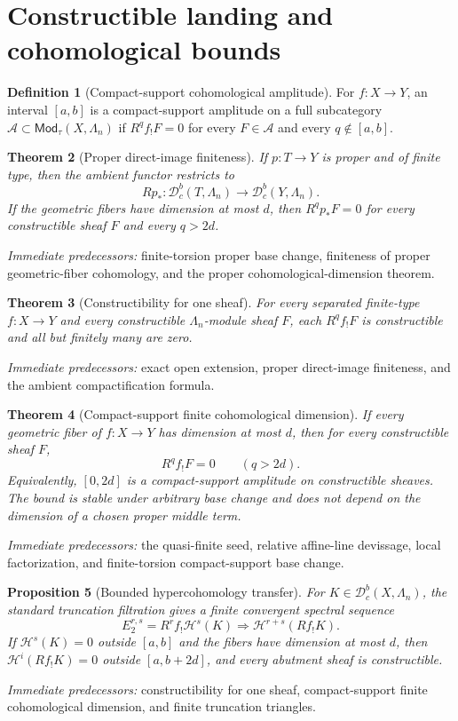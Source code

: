 \documentclass[10pt]{article}
\newtheorem{theorem}{Theorem}[section]
\newtheorem{proposition}[theorem]{Proposition}
\theoremstyle{definition}
\newtheorem{definition}[theorem]{Definition}
\newcommand{\Dbc}{\mathcal D^b_c}
\newcommand{\Mod}{\mathsf{Mod}}
\newcommand{\pred}[1]{\par\smallskip\begingroup\footnotesize\raggedright
\emph{Immediate predecessors:} #1.\par\endgroup}
\begin{document}
\section{Constructible landing and cohomological bounds}

\begin{definition}[Compact-support cohomological amplitude]
For \(f:X\to Y\), an interval \([a,b]\) is a compact-support amplitude on
a full subcategory \(\mathcal A\subset\Mod_\tau(X,\Lambda_n)\) if
\(R^qf_!F=0\) for every \(F\in\mathcal A\) and every
\(q\notin[a,b]\).
\end{definition}

\begin{theorem}[Proper direct-image finiteness]
If \(p:T\to Y\) is proper and of finite type, then the ambient functor
restricts to
\[
 Rp_*:\Dbc(T,\Lambda_n)\longrightarrow\Dbc(Y,\Lambda_n).
\]
If the geometric fibers have dimension at most \(d\), then
\(R^qp_*F=0\) for every constructible sheaf \(F\) and every \(q>2d\).
\end{theorem}
\pred{finite-torsion proper base change, finiteness of proper geometric-fiber cohomology, and the proper cohomological-dimension theorem}

\begin{theorem}[Constructibility for one sheaf]
For every separated finite-type \(f:X\to Y\) and every constructible
\(\Lambda_n\)-module sheaf \(F\), each \(R^qf_!F\) is constructible and
all but finitely many are zero.
\end{theorem}
\pred{exact open extension, proper direct-image finiteness, and the ambient compactification formula}

\begin{theorem}[Compact-support finite cohomological dimension]
If every geometric fiber of \(f:X\to Y\) has dimension at most \(d\), then
for every constructible sheaf \(F\),
\[
 R^qf_!F=0\qquad(q>2d).
\]
Equivalently, \([0,2d]\) is a compact-support amplitude on constructible
sheaves.  The bound is stable under arbitrary base change and does not
depend on the dimension of a chosen proper middle term.
\end{theorem}
\pred{the quasi-finite seed, relative affine-line devissage, local factorization, and finite-torsion compact-support base change}

\begin{proposition}[Bounded hypercohomology transfer]
For \(K\in\Dbc(X,\Lambda_n)\), the standard truncation filtration gives a
finite convergent spectral sequence
\[
 E_2^{r,s}=R^rf_!\mathcal H^s(K)
 \Longrightarrow \mathcal H^{r+s}(Rf_!K).
\]
If \(\mathcal H^s(K)=0\) outside \([a,b]\) and the fibers have dimension at
most \(d\), then \(\mathcal H^i(Rf_!K)=0\) outside \([a,b+2d]\), and every
abutment sheaf is constructible.
\end{proposition}
\pred{constructibility for one sheaf, compact-support finite cohomological dimension, and finite truncation triangles}
\end{document}
